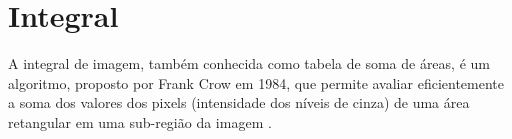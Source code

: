 \section{Integral}\label{sec:integral}

A integral de imagem, também conhecida como tabela de soma de áreas, é um
algoritmo, proposto por Frank Crow em 1984, que permite avaliar eficientemente a soma
dos valores dos pixels (intensidade dos níveis de cinza) de uma área retangular em uma
sub-região da imagem \cite{refer1}.
